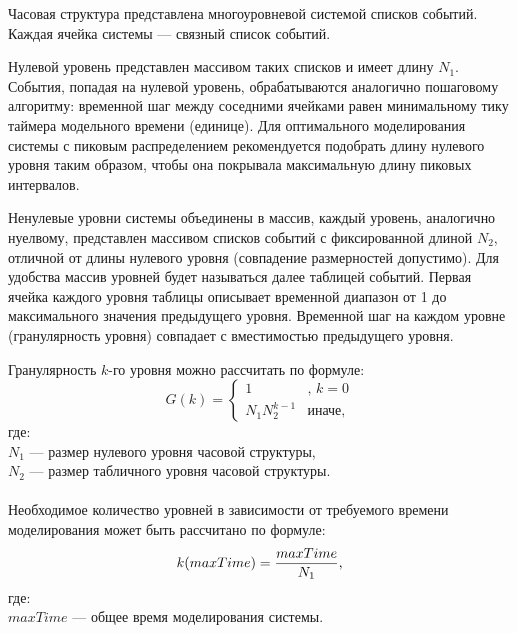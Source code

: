 Часовая структура представлена многоуровневой системой списков событий. Каждая ячейка системы --- связный список событий. 

Нулевой уровень представлен массивом таких списков и имеет длину $N_1$. События, попадая на нулевой уровень, обрабатываются аналогично пошаговому алгоритму: временной шаг между соседними ячейками равен минимальному тику таймера модельного времени (единице). Для оптимального моделирования системы с пиковым распределением рекомендуется подобрать длину нулевого уровня таким образом, чтобы она покрывала максимальную длину пиковых интервалов.

Ненулевые уровни системы объединены в массив, каждый уровень, аналогично нуелвому, представлен массивом списков событий с фиксированной длиной $N_2$, отличной от длины нулевого уровня (совпадение размерностей допустимо). Для удобства массив уровней будет называться далее таблицей событий. Первая ячейка каждого уровня таблицы описывает временной диапазон от 1 до максимального значения предыдущего уровня. Временной шаг на каждом уровне (гранулярность уровня) совпадает с вместимостью предыдущего уровня.

Гранулярность $k$-го уровня можно рассчитать по формуле:
\begin{equation}
	G(k) = 
	\begin{cases}
		1 & \text{, $k = 0$} \\
		N_1 N_2^{k-1} & \text{иначе,}
	\end{cases}
\end{equation}
где: \\
$N_1$ --- размер нулевого уровня часовой структуры, \\
$N_2$ --- размер табличного уровня часовой структуры. \\ \\



Необходимое количество уровней в зависимости от требуемого времени моделирования может быть рассчитано по формуле:
\begin{equation}
	k(maxTime) = \frac{maxTime} {N_1} \text{,}	\\
\end{equation}
где: \\
$maxTime$ --- общее время моделирования системы. \\ \\

